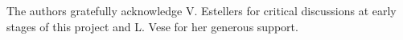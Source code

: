 The authors gratefully acknowledge V. Estellers for critical discussions at early stages of this project and L. Vese for her generous support.
